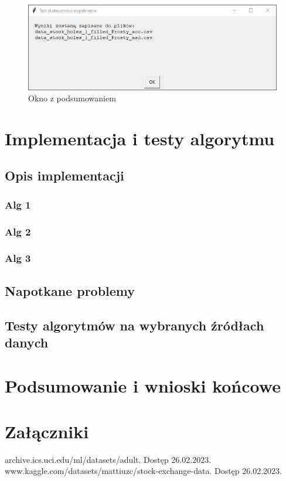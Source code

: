 \documentclass[12pt,twoside]{article}
\begin{document}
\begin{figure}[ht]
	\centering
	\includegraphics[width=12cm]{img/09.jpg}
	\caption{Okno z podsumowaniem}
\label{Fig:acc_end}
\end{figure}

\clearpage
\section{Implementacja i testy algorytmu}
\subsection{Opis implementacji}
\subsubsection{Alg 1}
\subsubsection{Alg 2}
\subsubsection{Alg 3}
\subsection{Napotkane problemy}
\subsection{Testy algorytmów na wybranych źródłach danych}
\clearpage


\section{Podsumowanie i wnioski końcowe}

\clearpage


\section*{Załączniki}


\clearpage



\begin{thebibliography}{4}
     archive.ics.uci.edu/ml/datasets/adult. Dostęp 26.02.2023.
     www.kaggle.com/datasets/mattiuzc/stock-exchange-data. Dostęp 26.02.2023.
\end{thebibliography}

\clearpage


\makesummary
\end{document}
